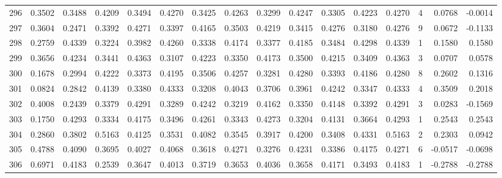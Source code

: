 \begin{tabular}{lrrrrrrrrrrrrrrr}
296 &      0.3502 &  0.3488 &  0.4209 &  0.3494 &  0.4270 &  0.3425 &  0.4263 &  0.3299 &  0.4247 &  0.3305 &   0.4223 &     0.4270 &      4 &                    0.0768 &                    -0.0014 \\
297 &      0.3604 &  0.2471 &  0.3392 &  0.4271 &  0.3397 &  0.4165 &  0.3503 &  0.4219 &  0.3415 &  0.4276 &   0.3180 &     0.4276 &      9 &                    0.0672 &                    -0.1133 \\
298 &      0.2759 &  0.4339 &  0.3224 &  0.3982 &  0.4260 &  0.3338 &  0.4174 &  0.3377 &  0.4185 &  0.3484 &   0.4298 &     0.4339 &      1 &                    0.1580 &                     0.1580 \\
299 &      0.3656 &  0.4234 &  0.3441 &  0.4363 &  0.3107 &  0.4223 &  0.3350 &  0.4173 &  0.3500 &  0.4215 &   0.3409 &     0.4363 &      3 &                    0.0707 &                     0.0578 \\
300 &      0.1678 &  0.2994 &  0.4222 &  0.3373 &  0.4195 &  0.3506 &  0.4257 &  0.3281 &  0.4280 &  0.3393 &   0.4186 &     0.4280 &      8 &                    0.2602 &                     0.1316 \\
301 &      0.0824 &  0.2842 &  0.4139 &  0.3380 &  0.4333 &  0.3208 &  0.4043 &  0.3706 &  0.3961 &  0.4242 &   0.3347 &     0.4333 &      4 &                    0.3509 &                     0.2018 \\
302 &      0.4008 &  0.2439 &  0.3379 &  0.4291 &  0.3289 &  0.4242 &  0.3219 &  0.4162 &  0.3350 &  0.4148 &   0.3392 &     0.4291 &      3 &                    0.0283 &                    -0.1569 \\
303 &      0.1750 &  0.4293 &  0.3334 &  0.4175 &  0.3496 &  0.4261 &  0.3343 &  0.4273 &  0.3204 &  0.4131 &   0.3664 &     0.4293 &      1 &                    0.2543 &                     0.2543 \\
304 &      0.2860 &  0.3802 &  0.5163 &  0.4125 &  0.3531 &  0.4082 &  0.3545 &  0.3917 &  0.4200 &  0.3408 &   0.4331 &     0.5163 &      2 &                    0.2303 &                     0.0942 \\
305 &      0.4788 &  0.4090 &  0.3695 &  0.4027 &  0.4068 &  0.3618 &  0.4271 &  0.3276 &  0.4231 &  0.3386 &   0.4175 &     0.4271 &      6 &                   -0.0517 &                    -0.0698 \\
306 &      0.6971 &  0.4183 &  0.2539 &  0.3647 &  0.4013 &  0.3719 &  0.3653 &  0.4036 &  0.3658 &  0.4171 &   0.3493 &     0.4183 &      1 &                   -0.2788 &                    -0.2788 \\

\end{tabular}
